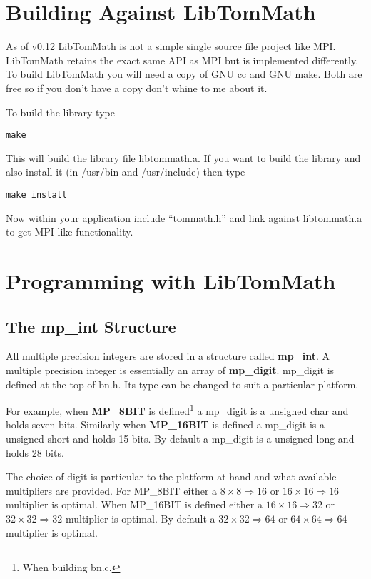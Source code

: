 \documentclass{article}
\begin{document}
\section{Building Against LibTomMath}

As of v0.12 LibTomMath is not a simple single source file project like MPI.  LibTomMath retains the exact same API as MPI
but is implemented differently.  To build LibTomMath you will need a copy of GNU cc and GNU make.  Both are free so if you 
don't have a copy don't whine to me about it.

To build the library type 

\begin{verbatim}
make
\end{verbatim}

This will build the library file libtommath.a.  If you want to build the library and also install it (in /usr/bin and /usr/include) then
type 

\begin{verbatim}
make install
\end{verbatim}

Now within your application include ``tommath.h'' and link against libtommath.a to get MPI-like functionality.

\section{Programming with LibTomMath}

\subsection{The mp\_int Structure}
All multiple precision integers are stored in a structure called \textbf{mp\_int}.  A multiple precision integer is
essentially an array of \textbf{mp\_digit}.  mp\_digit is defined at the top of bn.h.  Its type can be changed to suit
a particular platform.  

For example, when \textbf{MP\_8BIT} is defined\footnote{When building bn.c.} a mp\_digit is a unsigned char and holds 
seven bits.  Similarly when \textbf{MP\_16BIT} is defined a mp\_digit is a unsigned short and holds 15 bits.  
By default a mp\_digit is a unsigned long and holds 28 bits.  

The choice of digit is particular to the platform at hand and what available multipliers are provided.  For 
MP\_8BIT either a $8 \times 8 \Rightarrow 16$ or $16 \times 16 \Rightarrow 16$ multiplier is optimal.  When 
MP\_16BIT is defined either a $16 \times 16 \Rightarrow 32$ or $32 \times 32 \Rightarrow 32$ multiplier is optimal.  By
default a $32 \times 32 \Rightarrow 64$ or $64 \times 64 \Rightarrow 64$ multiplier is optimal.  
\end{document}
